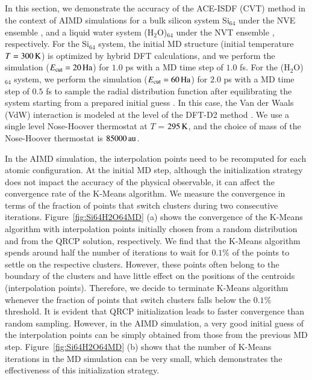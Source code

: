 \subsection{}
\label{c5subsec:conv}

In this section, we demonstrate the accuracy of the ACE-ISDF (CVT) method in the
context of AIMD simulations for a bulk silicon system Si$_{64}$ under the NVE
ensemble \cite{gibbs2014elementary}, and a liquid water system (H$_2$O)$_{64}$
under the NVT ensemble \cite{gibbs2014elementary}, respectively. For the Si$_
{64}$ system, the initial MD structure (initial temperature $T = 300\operatorname{K}$) is
optimized by hybrid DFT calculations, and we perform the simulation ($E_{
\text{cut}} = 20\operatorname{Ha}$) for $1.0$ ps with a MD time step of $1.0$ fs. For the 
(H$_2$O)$_{64}$ system, we perform the simulation ($E_{\text{cut}} = 60\operatorname{Ha}$) for
$2.0$ ps with a MD time step of $0.5$ fs to sample the radial distribution
function after equilibrating the system starting from a prepared initial guess 
\cite{JCP_141_084502_2014}. In this case, the Van der Waals (VdW) interaction is
modeled at the level of the DFT-D2 method \cite{JCC_27_1787_2006_Grimme}. We use
a single level Nose-Hoover thermostat \cite{JCP_81_511_1984_Nose,
PRA_31_1695_1985_Hoover} at $T$ = $295\operatorname{K}$, and the choice of mass of the
Nose-Hoover thermostat is $85000\operatorname{au}$.

In the AIMD simulation, the interpolation points need to be recomputed for each
atomic configuration. At the initial MD step, although the initialization
strategy does not impact the accuracy of the physical observable, it can affect
the convergence rate of the K-Means algorithm. We measure the convergence in
terms of the fraction of points that switch clusters during two consecutive
iterations. Figure~\ref{fig:Si64H2O64MD} (a) shows the convergence of the
K-Means algorithm with interpolation points initially chosen from a random
distribution and from the QRCP solution, respectively. We find that the K-Means
algorithm spends around half the number of iterations to wait for $0.1\%$ of the
points to settle on the respective clusters. However, these points often belong
to the boundary of the clusters and have little effect on the positions of the
centroids (interpolation points). Therefore, we decide to terminate K-Means
algorithm whenever the fraction of points that switch clusters falls below the
$0.1\%$ threshold. It is evident that QRCP initialization leads to faster
convergence than random sampling. However, in the AIMD simulation, a very good
initial guess of the interpolation points can be simply obtained from those from
the previous MD step. Figure~\ref{fig:Si64H2O64MD} (b) shows that the number of
K-Means iterations in the MD simulation can be very small, which demonstrates
the effectiveness of this initialization strategy.

